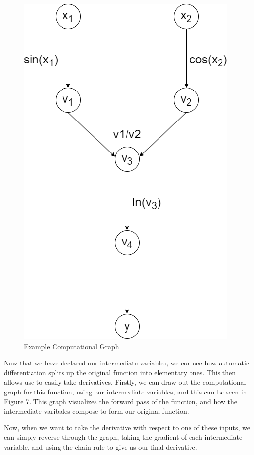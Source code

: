 \documentclass{article}
\begin{document}
    \begin{figure}
        \centering
        \includegraphics[scale = 0.34]{ExampleCompGraph.png}
        \caption{Example Computational Graph}
    \end{figure}
    Now that we have declared our intermediate variables, we can see how automatic differentiation splits up the original function into elementary ones.
    This then allows use to easily take derivatives. Firstly, we can draw out the computational graph for this function, using our intermediate variables,
    and this can be seen in Figure 7.
    This graph visualizes the forward pass of the function, and how the intermediate varibales compose to form our original function.

    Now, when we want to take the derivative with respect to one of these inputs, we can simply reverse through the graph, taking the gradient of each intermediate
    variable, and using the chain rule to give us our final derivative.
\end{document}
